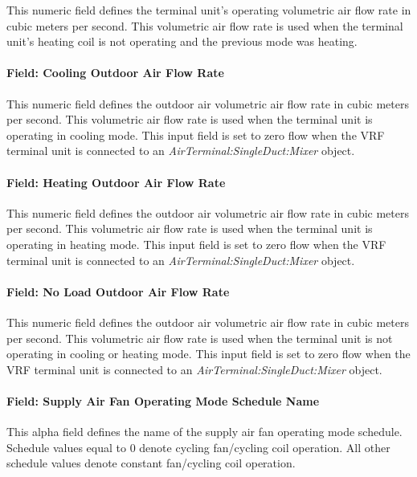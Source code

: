 This numeric field defines the terminal unit's operating volumetric air flow rate in cubic meters per second. This volumetric air flow rate is used when the terminal unit's heating coil is not operating and the previous mode was heating.

\paragraph{Field: Cooling Outdoor Air Flow Rate}\label{field-cooling-outdoor-air-flow-rate-3}

This numeric field defines the outdoor air volumetric air flow rate in cubic meters per second. This volumetric air flow rate is used when the terminal unit is operating in cooling mode. This input field is set to zero flow when the VRF terminal unit is connected to an \textit{AirTerminal:SingleDuct:Mixer} object.

\paragraph{Field: Heating Outdoor Air Flow Rate}\label{field-heating-outdoor-air-flow-rate-3}

This numeric field defines the outdoor air volumetric air flow rate in cubic meters per second. This volumetric air flow rate is used when the terminal unit is operating in heating mode. This input field is set to zero flow when the VRF terminal unit is connected to an \textit{AirTerminal:SingleDuct:Mixer} object.

\paragraph{Field: No Load Outdoor Air Flow Rate}\label{field-no-load-outdoor-air-flow-rate-2}

This numeric field defines the outdoor air volumetric air flow rate in cubic meters per second. This volumetric air flow rate is used when the terminal unit is not operating in cooling or heating mode. This input field is set to zero flow when the VRF terminal unit is connected to an \textit{AirTerminal:SingleDuct:Mixer} object.

\paragraph{Field: Supply Air Fan Operating Mode Schedule Name}\label{field-supply-air-fan-operating-mode-schedule-name-7}

This alpha field defines the name of the supply air fan operating mode schedule. Schedule values equal to 0 denote cycling fan/cycling coil operation. All other schedule values denote constant fan/cycling coil operation.

